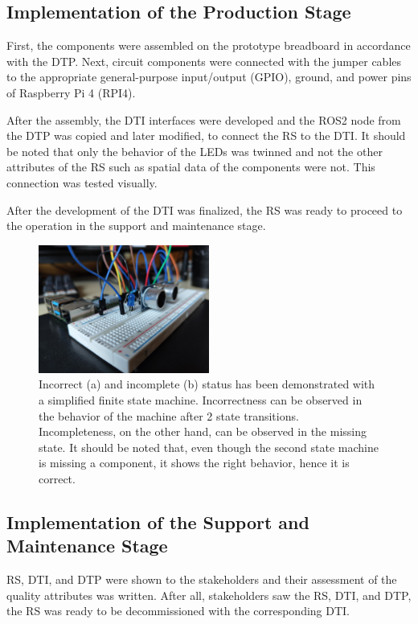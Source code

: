 \documentclass[conference]{IEEEtran}
\begin{document}
    \subsection{Implementation of the Production Stage}
    First, the components were assembled on the prototype breadboard in accordance with the DTP. Next, circuit components were connected with the jumper cables to the appropriate general-purpose input/output (GPIO), ground, and power pins of Raspberry Pi 4 (RPI4). 

    After the assembly, the DTI interfaces were developed and the ROS2 node from the DTP was copied and later modified, to connect the RS to the DTI. It should be noted that only the behavior of the LEDs was twinned and not the other attributes of the RS such as spatial data of the components were not. This connection was tested visually. 

    After the development of the DTI was finalized, the RS was ready to proceed to the operation in the support and maintenance stage.

    \begin{figure}[htbp]
        \centering
        \includegraphics[width=0.5\textwidth]{Assembled.jpg}
        \caption{Incorrect (a) and incomplete (b) status has been demonstrated with a simplified finite state machine. Incorrectness can be observed in the behavior 
        of the machine after 2 state transitions. Incompleteness, on the other hand, can be observed in the missing state. It should be noted that, even though the second state machine is missing a 
        component, it shows the right behavior, hence it is correct.}\label{fig:Assembled}
    \end{figure}

    \subsection{Implementation of the Support and Maintenance Stage}
    RS, DTI, and DTP were shown to the stakeholders and their assessment of the quality attributes was written. After all, stakeholders saw the RS, DTI, and DTP, the RS was ready to be decommissioned with the corresponding DTI.
    
\end{document}
